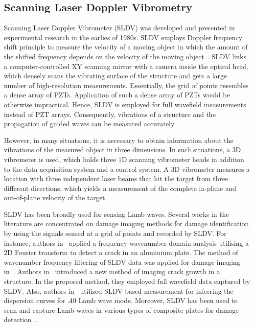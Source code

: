\subsection{Scanning Laser Doppler Vibrometry} 
Scanning Laser Doppler Vibrometer (SLDV) was developed and presented in experimen\-tal research in the earlies of 1980s. 
SLDV employs Doppler frequency shift principle to measure the velocity of a moving object in which the amount of the shifted frequency depends on the velocity of the moving object~\cite{Stanbridge1999}. 
SLDV links a computer-controlled XY scanning mirror with a camera inside the optical head, which densely scans the vibrating surface of the structure and gets a large number of high-resolution measurements\cite{Helfrick2011}. 
Essentially, the grid of points resembles a dense array of PZTs. 
Application of such a dense array of PZTs would be otherwise impractical.  
Hence, SLDV is employed for full wavefield measurements instead of PZT arrays. 
Consequently, vibrations of a structure and the propagation of guided waves can be measured accurately~\cite{Ostachowicz2014}.

However, in many situations, it is necessary to obtain information about the vibrations of the measured object in three dimensions. 
In such situations, a 3D vibrometer is used, which holds three 1D scanning vibrometer heads in addition to the data acquisition system and a control system.
A 3D vibrometer measures a location with three independent laser beams that hit the target from three different directions, which yields a measurement of the complete in-plane and out-of-plane velocity of the target.

SLDV has been broadly used for sensing Lamb waves. 
Several works in the literature are concentrated on damage imaging methods for damage identification by using the signals sensed at a grid of points and recorded by SLDV.
For instance, authors in~\cite{Yu2013} applied a frequency wavenumber domain analysis utilising a 2D Fourier transform to detect a crack in an aluminium plate. 
The method of wavenumber frequency filtering of SLDV data was applied for damage imaging in~\cite{Ruzzene2007}. 
Authors in~\cite{Kudela2015} introduced a new method of imaging crack growth in a structure.
In the proposed method, they employed full wavefield data captured by SLDV.
Also, authors in~\cite{Harb2015} utilized SLDV based measurement for inferring the dispersion curves for \(A0\) Lamb wave mode. 
Moreover, SLDV has been used to scan and capture Lamb waves in various types of composite plates for damage detection~\cite{Lamboul2013, Radzienski2019,Sohn2011, An2016,Rogge2013,  Tian2015}.

